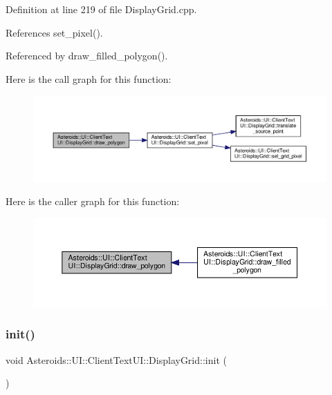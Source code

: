 Definition at line 219 of file Display\+Grid.\+cpp.



References set\+\_\+pixel().



Referenced by draw\+\_\+filled\+\_\+polygon().

Here is the call graph for this function\+:\nopagebreak
\begin{figure}[H]
\begin{center}
\leavevmode
\includegraphics[width=350pt]{classAsteroids_1_1UI_1_1ClientTextUI_1_1DisplayGrid_aaf3c070c4d620f5a8420e349f5501bfd_cgraph}
\end{center}
\end{figure}
Here is the caller graph for this function\+:\nopagebreak
\begin{figure}[H]
\begin{center}
\leavevmode
\includegraphics[width=350pt]{classAsteroids_1_1UI_1_1ClientTextUI_1_1DisplayGrid_aaf3c070c4d620f5a8420e349f5501bfd_icgraph}
\end{center}
\end{figure}
\mbox{\label{classAsteroids_1_1UI_1_1ClientTextUI_1_1DisplayGrid_a56b4a0b5f6d69ac13c3c7212db3e77b0}} 
\subsubsection{\texorpdfstring{init()}{init()}}
{\footnotesize\ttfamily void Asteroids\+::\+U\+I\+::\+Client\+Text\+U\+I\+::\+Display\+Grid\+::init (\begin{DoxyParamCaption}{ }\end{DoxyParamCaption})\hspace{0.3cm}{\ttfamily [private]}}




